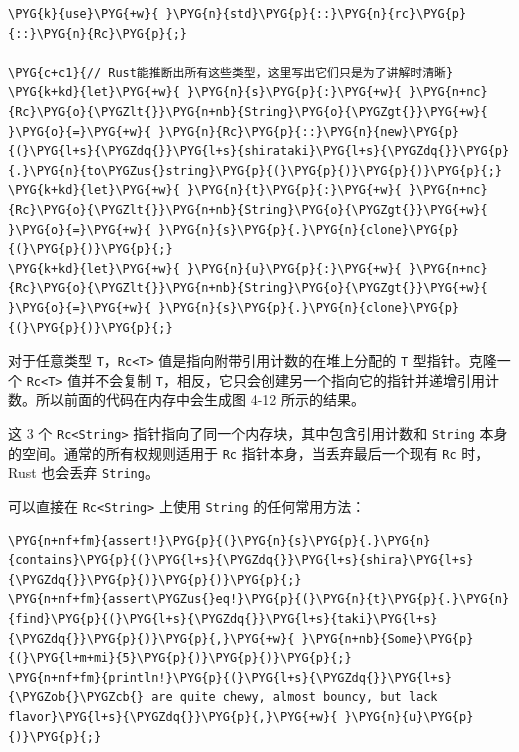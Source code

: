 \begin{Verbatim}[commandchars=\\\{\},breaklines=true,breakanywhere=true,fontsize=\codefont,xleftmargin=17bp]
\PYG{k}{use}\PYG{+w}{ }\PYG{n}{std}\PYG{p}{::}\PYG{n}{rc}\PYG{p}{::}\PYG{n}{Rc}\PYG{p}{;}

\PYG{c+c1}{// Rust能推断出所有这些类型，这里写出它们只是为了讲解时清晰}
\PYG{k+kd}{let}\PYG{+w}{ }\PYG{n}{s}\PYG{p}{:}\PYG{+w}{ }\PYG{n+nc}{Rc}\PYG{o}{\PYGZlt{}}\PYG{n+nb}{String}\PYG{o}{\PYGZgt{}}\PYG{+w}{ }\PYG{o}{=}\PYG{+w}{ }\PYG{n}{Rc}\PYG{p}{::}\PYG{n}{new}\PYG{p}{(}\PYG{l+s}{\PYGZdq{}}\PYG{l+s}{shirataki}\PYG{l+s}{\PYGZdq{}}\PYG{p}{.}\PYG{n}{to\PYGZus{}string}\PYG{p}{(}\PYG{p}{)}\PYG{p}{)}\PYG{p}{;}
\PYG{k+kd}{let}\PYG{+w}{ }\PYG{n}{t}\PYG{p}{:}\PYG{+w}{ }\PYG{n+nc}{Rc}\PYG{o}{\PYGZlt{}}\PYG{n+nb}{String}\PYG{o}{\PYGZgt{}}\PYG{+w}{ }\PYG{o}{=}\PYG{+w}{ }\PYG{n}{s}\PYG{p}{.}\PYG{n}{clone}\PYG{p}{(}\PYG{p}{)}\PYG{p}{;}
\PYG{k+kd}{let}\PYG{+w}{ }\PYG{n}{u}\PYG{p}{:}\PYG{+w}{ }\PYG{n+nc}{Rc}\PYG{o}{\PYGZlt{}}\PYG{n+nb}{String}\PYG{o}{\PYGZgt{}}\PYG{+w}{ }\PYG{o}{=}\PYG{+w}{ }\PYG{n}{s}\PYG{p}{.}\PYG{n}{clone}\PYG{p}{(}\PYG{p}{)}\PYG{p}{;}
\end{Verbatim}

对于任意类型 \texttt{T}，\texttt{Rc<T>} 值是指向附带引用计数的在堆上分配的 \texttt{T} 型指针。克隆一个 \texttt{Rc<T>} 值并不会复制 \texttt{T}，相反，它只会创建另一个指向它的指针并递增引用计数。所以前面的代码在内存中会生成图 4-12 所示的结果。


这 3 个 \texttt{Rc<String>} 指针指向了同一个内存块，其中包含引用计数和 \texttt{String} 本身的空间。通常的所有权规则适用于 \texttt{Rc} 指针本身，当丢弃最后一个现有 \texttt{Rc} 时，Rust 也会丢弃 \texttt{String}。

可以直接在 \texttt{Rc<String>} 上使用 \texttt{String} 的任何常用方法：

\begin{Verbatim}[commandchars=\\\{\},breaklines=true,breakanywhere=true,fontsize=\codefont,xleftmargin=17bp]
\PYG{n+nf+fm}{assert!}\PYG{p}{(}\PYG{n}{s}\PYG{p}{.}\PYG{n}{contains}\PYG{p}{(}\PYG{l+s}{\PYGZdq{}}\PYG{l+s}{shira}\PYG{l+s}{\PYGZdq{}}\PYG{p}{)}\PYG{p}{)}\PYG{p}{;}
\PYG{n+nf+fm}{assert\PYGZus{}eq!}\PYG{p}{(}\PYG{n}{t}\PYG{p}{.}\PYG{n}{find}\PYG{p}{(}\PYG{l+s}{\PYGZdq{}}\PYG{l+s}{taki}\PYG{l+s}{\PYGZdq{}}\PYG{p}{)}\PYG{p}{,}\PYG{+w}{ }\PYG{n+nb}{Some}\PYG{p}{(}\PYG{l+m+mi}{5}\PYG{p}{)}\PYG{p}{)}\PYG{p}{;}
\PYG{n+nf+fm}{println!}\PYG{p}{(}\PYG{l+s}{\PYGZdq{}}\PYG{l+s}{\PYGZob{}\PYGZcb{} are quite chewy, almost bouncy, but lack flavor}\PYG{l+s}{\PYGZdq{}}\PYG{p}{,}\PYG{+w}{ }\PYG{n}{u}\PYG{p}{)}\PYG{p}{;}
\end{Verbatim}

